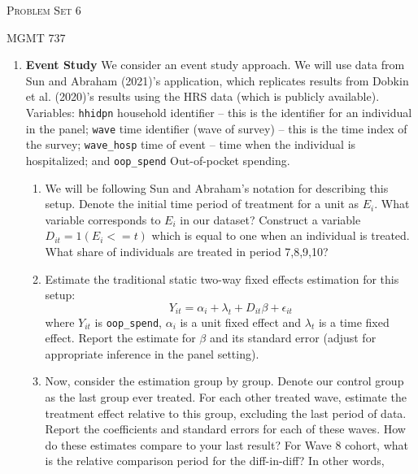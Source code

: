 \documentclass[11pt, a4paper]{article}
\begin{document}
\begin{center}
  {\Large \textsc{Problem Set 6}}

  MGMT 737
\end{center}



\begin{enumerate}
    \item\textbf{Event Study} We consider an event study
      approach. We will use data from Sun and Abraham (2021)'s
      application, which replicates results from Dobkin et al. (2020)'s
      results using the HRS data (which is publicly available). Variables:
      \texttt{hhidpn} household identifier -- this is the identifier for
      an individual in the panel; \texttt{wave} time identifier (wave of
      survey) -- this is the time index of the survey; \texttt{wave\_hosp}
      time of event -- time when the individual is hospitalized; and
      \texttt{oop\_spend} Out-of-pocket spending.
      \begin{enumerate}
      \item We will be following Sun and Abraham's notation for describing
        this setup. Denote the initial time period of treatment for a unit
        as $E_{i}$. What variable corresponds to $E_{i}$ in our dataset?
        Construct a variable $D_{it} = 1(E_{i} <= t)$ which is equal to
        one when an individual is treated. What share of individuals are
        treated in period 7,8,9,10?
      \item Estimate the traditional static two-way fixed effects
        estimation for this setup:
        \begin{equation}\label{eq:twfe}
          Y_{it} = \alpha_{i} + \lambda_{t} + D_{it}\beta + \epsilon_{it}
        \end{equation}
        where $Y_{it}$ is \texttt{oop\_spend}, $\alpha_{i}$ is a unit
        fixed effect and $\lambda_{t}$ is a time fixed effect. Report the
        estimate for $\beta$ and its standard error (adjust for
        appropriate inference in the panel setting). 
      \item Now, consider the estimation group by group. Denote our
        control group as the last group ever treated. For each other
        treated wave, estimate the treatment effect relative to this
        group, excluding the last period of data. Report the coefficients
        and standard errors for each of these waves. How do these
        estimates compare to your last result? For Wave 8 cohort, what is the
        relative comparison period for the diff-in-diff? In other words,

\end{enumerate}
\end{enumerate}
\end{document}
